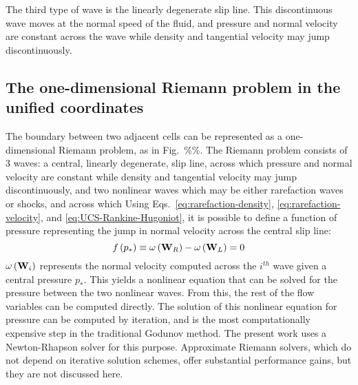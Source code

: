 The third type of wave is the linearly degenerate slip line. This discontinuous wave moves at the normal speed of the fluid, and pressure and normal velocity are constant across the wave while density and tangential velocity may jump discontinuously. 

\subsection{The one-dimensional Riemann problem in the unified coordinates}

The boundary between two adjacent cells can be represented as a one-dimensional Riemann problem, as in Fig.~\%\%. The Riemann problem consists of 3 waves: a central, linearly degenerate, slip line, across which pressure and normal velocity are constant while density and tangential velocity may jump discontinuously, and two nonlinear waves which may be either rarefaction waves or shocks, and across which 
Using Eqs.~\ref{eq:rarefaction-density}, \ref{eq:rarefaction-velocity}, and \ref{eq:UCS-Rankine-Hugoniot}, it is possible to define a function of pressure representing the jump in normal velocity across the central slip line:
\[f\left( {p_*} \right) \equiv \omega \left( {{{\bf{W}}_R}} \right) - \omega \left( {{{\bf{W}}_L}} \right) = 0\]
$\omega \left( {{{\bf{W}}_i}} \right)$ represents the normal velocity computed across the $i^{th}$ wave given a central pressure $p_*$. This yields a nonlinear equation that can be solved for the pressure between the two nonlinear waves. From this, the rest of the flow variables can be computed directly. The solution of this nonlinear equation for pressure can be computed by iteration, and is the most computationally expensive step in the traditional Godunov method. The present work uses a Newton-Rhapson solver for this purpose. Approximate Riemann solvers, which do not depend on iterative solution schemes, offer substantial performance gains, but they are not discussed here.

